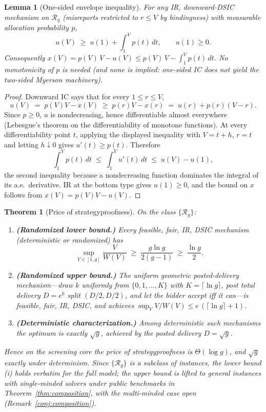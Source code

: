 \documentclass[11pt]{article}
\newtheorem{theorem}{Theorem}
\newtheorem{lemma}{Lemma}
\theoremstyle{remark}
\begin{document}
\begin{lemma}[One-sided envelope inequality]\label{lem:envelope}
For any IR, downward-DSIC mechanism on $\mathcal R_g$ (misreports
restricted to $r\le V$ by bindingness) with measurable allocation
probability $p$,
\[
u(V)\;\ge\;u(1)+\int_1^V p(t)\,dt,\qquad u(1)\ge0 .
\]
Consequently
$x(V)=p(V)\,V-u(V)\le p(V)\,V-\int_1^V p(t)\,dt$.
No monotonicity of $p$ is needed (and none is implied: one-sided IC does
not yield the two-sided Myerson machinery).
\end{lemma}

\begin{proof}
Downward IC says that for every $1\le r\le V$,
\[
u(V)\;=\;p(V)V-x(V)\;\ge\;p(r)V-x(r)\;=\;u(r)+p(r)(V-r).
\]
Since $p\ge0$, $u$ is nondecreasing, hence differentiable almost
everywhere (Lebesgue's theorem on the differentiability of monotone
functions). At every differentiability point $t$, applying the displayed
inequality with $V=t+h$, $r=t$ and letting $h\downarrow0$ gives
$u'(t)\ge p(t)$. Therefore
\[
\int_1^V p(t)\,dt\;\le\;\int_1^V u'(t)\,dt\;\le\;u(V)-u(1),
\]
the second inequality because a nondecreasing function dominates the
integral of its a.e.\ derivative. IR at the bottom type gives $u(1)\ge0$,
and the bound on $x$ follows from $x(V)=p(V)V-u(V)$.
\end{proof}

\begin{theorem}[Price of strategyproofness]\label{thm:posp}
On the class $\{\mathcal R_g\}$:
\begin{enumerate}[label=(\roman*),leftmargin=2em]
\item \textbf{(Randomized lower bound.)} Every feasible, fair, IR, DSIC
mechanism (deterministic or randomized) has
\[
\sup_{V\in[1,g]}\frac{V}{W(V)}\;\ge\;\frac{g\ln g}{2(g-1)}\;\ge\;
\frac{\ln g}{2}.
\]
\item \textbf{(Randomized upper bound.)} The uniform geometric
posted-delivery mechanism---draw $k$ uniformly from
$\{0,1,\dots,K\}$ with $K=\lceil\ln g\rceil$, post total delivery
$D=e^k$ split $(D/2,D/2)$, and let the bidder accept iff it can---is
feasible, fair, IR, DSIC, and achieves
$\sup_V V/W(V)\le e\,(\lceil\ln g\rceil+1)$.
\item \textbf{(Deterministic characterization.)} Among deterministic such
mechanisms the optimum is exactly $\sqrt g$, achieved by the posted
delivery $D=\sqrt g$.
\end{enumerate}
Hence on the screening core the price of strategyproofness is
$\Theta(\log g)$, and $\sqrt g$ exactly under determinism. Since
$\{\mathcal R_g\}$ is a subclass of instances, the lower bound (i) holds
verbatim for the full model; the upper bound is lifted to general
instances with single-minded solvers under public benchmarks in
Theorem~\ref{thm:composition}, with the multi-minded case open
(Remark~\ref{conj:composition}).
\end{theorem}
\end{document}

